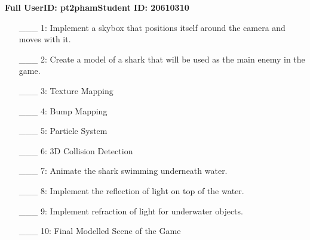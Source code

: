 \documentclass {article}
\begin{document}

{\hfill{\bf Full UserID: pt2pham}\hfill{\bf Student ID: 20610310}\hfill}

\begin{enumerate}
     \item[\_\_\_ 1:]  Implement a skybox that positions itself around the camera and moves with it.

     \item[\_\_\_ 2:]  Create a model of a shark that will be used as the main enemy in the game.

     \item[\_\_\_ 3:]  Texture Mapping

     \item[\_\_\_ 4:]  Bump Mapping

     \item[\_\_\_ 5:]  Particle System

     \item[\_\_\_ 6:]  3D Collision Detection

     \item[\_\_\_ 7:]  Animate the shark swimming underneath water.

     \item[\_\_\_ 8:]  Implement the reflection of light on top of the water.

     \item[\_\_\_ 9:]  Implement refraction of light for underwater objects.

     \item[\_\_\_ 10:]  Final Modelled Scene of the Game
\end{enumerate}
\end{document}
